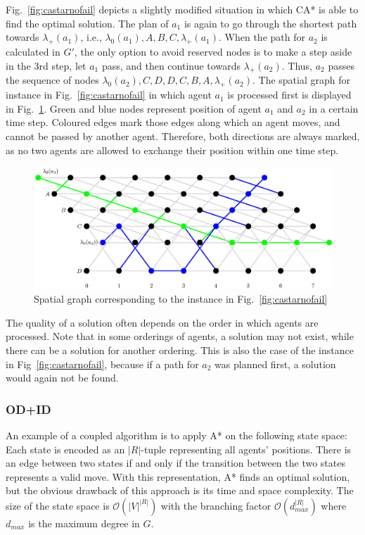 Fig.~\ref{fig:castarnofail} depicts a slightly modified situation in which CA* is able to find the optimal solution.
The plan of $a_1$ is again to go through the shortest path towards $\lambda_+(a_1)$, i.e., $\lambda_0(a_1), A, B, C, \lambda_+(a_1)$.
When the path for $a_2$ is calculated in $G'$, the only option to avoid reserved nodes is to make a step aside in the 3rd step, let $a_1$ pass, and then continue towards $\lambda_+(a_2)$.
Thus, $a_2$ passes the sequence of nodes $\lambda_0(a_2), C, D, D, C, B, A,\lambda_+(a_2)$.
The spatial graph for instance in Fig.~\ref{fig:castarnofail} in which agent $a_1$ is processed first is displayed in Fig.~\ref{fig:spatial}.
Green and blue nodes represent position of agent $a_1$ and $a_2$ in a certain time step.
Coloured edges mark those edges along which an agent moves, and cannot be passed by another agent.
Therefore, both directions are always marked, as no two agents are allowed to exchange their position within one time step.
\begin{figure}
    \centering
	\includegraphics[scale=0.85]{figurer/castar3d.eps}
	\caption{Spatial graph corresponding to the instance in Fig.~\ref{fig:castarnofail}}
  \label{fig:spatial}
\end{figure}
The quality of a solution often depends on the order in which agents are processed. 
Note that in some orderings of agents, a solution may not exist, while there can be a solution for another ordering.
This is also the case of the instance in Fig~\ref{fig:castarnofail}, because if a path for $a_2$ was planned first, a solution would again not be found.

\subsubsection{OD+ID}

An example of a coupled algorithm is to apply A* on the following state space:
Each state is encoded as an $|R|$-tuple representing all agents' positions.
There is an edge between two states if and only if the transition between the two states represents a valid move.
With this representation, A* finds an optimal solution, but the obvious drawback of this approach is its time and space complexity.
The size of the state space is $\mathcal{O}(|V|^{|R|})$ with the branching factor $\mathcal{O}(d_{max}^{|R|})$ where $d_{max}$ is the maximum degree in $G$.

